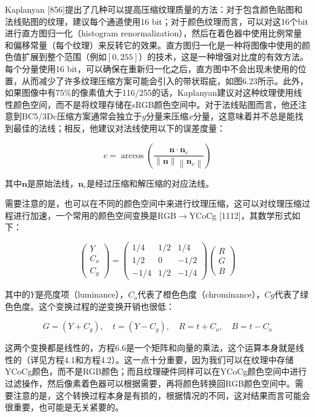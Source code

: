 \documentclass[
  paper=a4,
  ,captions=tableheading
]{scrartcl}
\begin{document}
Kaplanyan
{[}856{]}提出了几种可以提高压缩纹理质量的方法：对于包含颜色贴图和法线贴图的纹理，建议每个通道使用16
bit；对于颜色纹理而言，可以对这16个bit进行直方图归一化（histogram
renormalization），然后在着色器中使用比例常量和偏移常量（每个纹理）来反转它的效果。直方图归一化是一种将图像中使用的颜色值扩展到整个范围（例如\([0,255]\)）的技术，这是一种增强对比度的有效方法。每个分量使用16
bit，可以确保在重新归一化之后，直方图中不会出现未使用的位置，从而减少了许多纹理压缩方案可能会引入的带状瑕疵，如图6.23所示。此外，如果图像中有75\%的像素值大于116/255的话，Kaplanyan建议对这种纹理使用线性颜色空间，而不是将纹理存储在sRGB颜色空间中。对于法线贴图而言，他还注意到BC5/3Dc压缩方案通常会独立于\(y\)分量来压缩\(x\)分量，这意味着并不总是能找到最佳的法线；相反，他建议对法线使用以下的误差度量：

\[
  e=\arccos \left(\frac{\mathbf{n} \cdot \mathbf{n}_{c}}{\|\mathbf{n}\|\left\|\mathbf{n}_{c}\right\|}\right)
  \tag{6.5}
\]

其中\(\mathbf{n}\)是原始法线，\(\mathbf{n}_c\)是经过压缩和解压缩的对应法线。

需要注意的是，也可以在不同的颜色空间中来进行纹理压缩，这可以对纹理压缩过程进行加速，一个常用的颜色空间变换是RGB\(\to\)YCoCg
{[}1112{]}，其数学形式如下：

\[
  \left(\begin{array}{c}Y \\ C_{o} \\ C_{g}\end{array}\right)=\left(\begin{array}{rcr}1 / 4 & 1 / 2 & 1 / 4 \\ 1 / 2 & 0 & -1 / 2 \\ -1 / 4 & 1 / 2 & -1 / 4\end{array}\right)\left(\begin{array}{l}R \\ G \\ B\end{array}\right)
  \tag{6.6}
\]

其中的\(Y\)是亮度项（luminance），\(C_{o}\)代表了橙色色度（chrominance），\(Cg\)代表了绿色色度。这个变换过程的逆变换开销也很低：

\[
  G=\left(Y+C_{g}\right), \quad t=\left(Y-C_{g}\right), \quad R=t+C_{o}, \quad B=t-C_{o}
  \tag{6.7}
\]

这两个变换都是线性的，方程6.6是一个矩阵和向量的乘法，这个运算本身就是线性的（详见方程4.1和方程4.2）。这一点十分重要，因为我们可以在纹理中存储YCoCg颜色，而不是RGB颜色；而且纹理硬件同样可以在YCoCg颜色空间中进行过滤操作，然后像素着色器可以根据需要，再将颜色转换回RGB颜色空间中。需要注意的是，这个转换过程本身是有损的，根据情况的不同，这对结果而言可能会很重要，也可能是无关紧要的。
\end{document}

